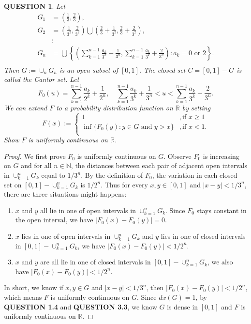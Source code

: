 \documentclass[12pt]{article}
\renewcommand{\(}{\left(}%
\renewcommand{\)}{\right)}%
\renewcommand{\[}{\left[}%
\renewcommand{\]}{\right]}%
\renewcommand{\r}{\mathbb{R}}
\newcommand{\n}{\mathbb{N}}
\newtheorem{question}{QUESTION}[section]}
\newtheorem{proof}{Proof.}}
\begin{document}
  \begin{question}
   Let
   \begin{equation*}
    \begin{split}
     G_1&=\(\frac{1}{3},\frac{2}{3} \),\\
     G_2&=\(\frac{1}{3^2},\frac{2}{3^2} \)\bigcup\(\frac{2}{3} +\frac{1}{3^2},\frac{2}{3}+ \frac{2}{3^2} \) ,\\
     &\vdots\\
     G_n&=\bigcup\left\{ \(\sum_{k=1}^{n-1} \frac{a_k}{3^k}+\frac{1}{3^n} ,\sum_{k=1}^{n-1} \frac{a_k}{3^k}+\frac{2}{3^n} \): a_k=0 \text{ or }2 \right\} .\\
    \end{split}
   \end{equation*}
   Then $G:=\cup_n G_n$ is an open subset of $[0,1]$. The closed set $C=[0,1]-G$ is called the {\normalfont \itshape Cantor set}. Let
   \begin{equation*}
    F_0(u)=\sum_{k=1}^{n-1}\frac{a_k}{2^k}+\frac{1}{2^n},\quad \sum_{k=1}^{n-1}\frac{a_k}{3^k}+\frac{1}{3^n}<u<\sum_{k=1}^{n-1}\frac{a_k}{3^k}+\frac{2}{3^n}.
   \end{equation*}
   We can extend $F$ to a probability distribution function on $\r$ by setting
   \begin{equation*}
    F(x):=
    \begin{cases}
     1&,\mbox{if }x\geq 1\\
     \inf\{F_0(y):y\in G \text{ and }y>x\} &,\mbox{if }x<1.\\
    \end{cases}
   \end{equation*}
   Show $F$ is uniformly continuous on $\r$.
  \end{question}
  \begin{proof}
   We first prove $F_0$ is uniformly continuous on $G$. Observe $F_0$ is increasing on $G$ and for all $n\in\n$, the distances between each pair of adjacent open intervals in $\cup_{k=1}^n G_k$ equal to $1/3^{n}$. By the definition of $F_0$, the variation in each closed set on $[0,1]-\cup_{k=1}^nG_k$ is $1/2^n$. Thus for every $x,y\in [0,1]$ and $|x-y|<1/3^n$, there are three situations might happens:
   \begin{enumerate}
    \item $x$ and $y$ all lie in one of open intervals in $\cup_{k=1}^n G_k$. Since $F_0$ stays constant in the open interval, we have $|F_0(x)-F_0(y)|=0$.
    \item $x$ lies in one of open intervals in $\cup_{k=1}^n G_k$ and $y$ lies in one of closed intervals in $[0,1]-\cup_{k=1}^n G_k$, we have $|F_0(x)-F_0(y)|<1/2^n$.
    \item $x$ and $y$ are all lie in one of closed intervals in $[0,1]-\cup_{k=1}^n G_k$, we also have $|F_0(x)-F_0(y)|<1/2^n$.
   \end{enumerate}
   In short, we know if $x,y\in G$ and $|x-y|<1/3^n$, then $|F_0(x)-F_0(y)|<1/2^n$, which means $F$ is uniformly continuous on $G$. Since $dx(G)=1$, by {\bfseries QUESTION 1.4} and {\bfseries QUESTION 3.3}, we know $G$ is dense in $[0,1]$ and $F$ is uniformly continuous on $\r$.
  \end{proof}
\end{document}
